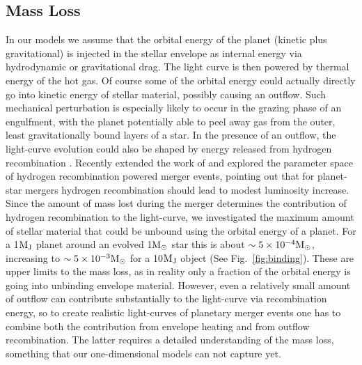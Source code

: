 \documentclass[twocolumn]{aastex62}
\newcommand{\Msun}{\ensuremath{{\rm M}_\odot}}
\newcommand{\Mj}{\ensuremath{{\rm M}_{\rm J}}}
\begin{document}
\subsection{Mass Loss}
In our models we assume that the orbital energy of the planet (kinetic plus gravitational) is injected in the stellar envelope as internal energy via hydrodynamic or gravitational drag. The light curve is then powered by thermal energy of the hot gas.
Of course some of the orbital energy could actually directly go into kinetic energy of stellar material, possibly causing an outflow. Such mechanical perturbation is especially likely to occur in the grazing phase of an engulfment, with the planet potentially able to peel away gas from the outer, least gravitationally bound layers of a star. 
In the presence of an outflow,  the light-curve evolution could also be shaped by energy released from hydrogen recombination \citep{Ivanova:2013}.
Recently \citet{Matsumoto:2022} extended the work of \citet{Ivanova:2013} and explored the parameter space of hydrogen recombination powered merger events, pointing out that for planet-star mergers hydrogen recombination should lead to modest luminosity increase.
Since the amount of mass lost during the merger determines the contribution of hydrogen recombination to the light-curve, we investigated the maximum amount of stellar material that could be unbound using the orbital energy of a planet. For a 1$\Mj$ planet around an evolved 1$\Msun$ star this is about $\sim 5\times10^{-4}\Msun$, increasing to $\sim 5\times10^{-3}\Msun$ for a 10$\Mj$ object (See Fig.~\ref{fig:binding}). These are upper limits to the mass loss, as in reality only a fraction of the orbital energy is going into unbinding envelope material.
However, even a relatively small amount of outflow can contribute substantially to the light-curve via recombination energy, so to create realistic light-curves of planetary merger events one has to combine both the contribution from envelope heating and from outflow recombination. The latter requires a detailed understanding of the mass loss, something that our one-dimensional models can not capture yet. 



\end{document}
